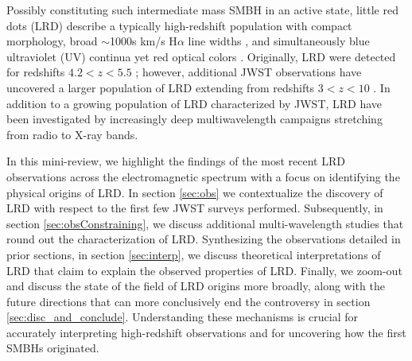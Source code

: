 \documentclass[utf8]{FrontiersinHarvard} %
\begin{document}
Possibly constituting such intermediate mass SMBH in an active state, little red dots (LRD) describe a typically high-redshift population with compact morphology, broad $\sim$1000s km/s H$\alpha$ line widths \citep{kocevski2024rise, zhang2025analysis}, and simultaneously blue ultraviolet (UV) continua yet red optical colors \citep{setton2024little, hviding2025rubies}. Originally, LRD were detected for redshifts $4.2 < z < 5.5$ \citep{matthee2024little}; however, additional JWST observations have uncovered a larger population of LRD extending from redshifts $3 < z < 10$ \citep{labbe2024uncover,graham2025dot}. In addition to a growing population of LRD characterized by JWST, LRD have been investigated by increasingly deep multiwavelength campaigns stretching from radio to X-ray bands.


In this mini-review, we highlight the findings of the most recent LRD observations across the electromagnetic spectrum with a focus on identifying the physical origins of LRD. In section \ref{sec:obs} we contextualize the discovery of LRD with respect to the first few JWST surveys performed. Subsequently, in section \ref{sec:obsConstraining}, we discuss additional multi-wavelength studies that round out the characterization of LRD. 
Synthesizing the observations detailed in prior sections, in section \ref{sec:interp}, we discuss theoretical interpretations of LRD that claim to explain the observed properties of LRD. Finally, we zoom-out and discuss the state of the field of LRD origins more broadly, along with the future directions that can more conclusively end the controversy in section \ref{sec:disc_and_conclude}. Understanding these mechanisms is crucial for accurately interpreting high-redshift observations and for uncovering how the first SMBHs originated.
\end{document}

